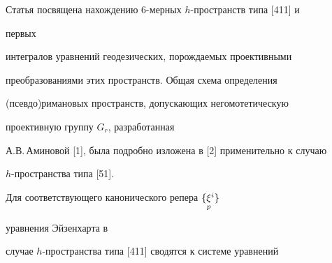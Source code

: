 \pagestyle{plain} %


 




\maketitle 


\label{begin} 


 


 


Статья посвящена нахождению 6-мерных $h$-пространств типа [411] и 


первых 


интегралов уравнений геодезических, порождаемых проективными 


преобразованиями этих пространств. Общая схема определения 


(псевдо)римановых пространств, допускающих негомотетическую 


проективную группу $G_r$, разработанная  


А.В.\,Аминовой [1], была подробно изложена в [2] применительно к случаю  


$h$-пространства типа [51]. 


 


Для соответствующего канонического репера $\{\underset{p}{\xi}{}^i\}$ 


уравнения Эйзенхарта в 


случае $h$-про\-ст\-ран\-ства типа [411] сводятся к системе уравнений 


